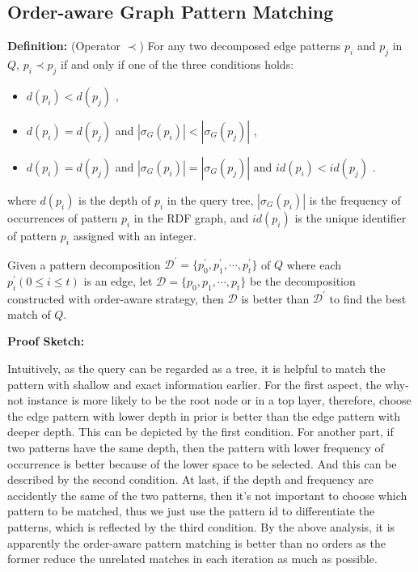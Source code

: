 \documentclass{article}
\begin{document}



\subsection{Order-aware Graph Pattern Matching}
\textbf{Definition:} (Operator $\prec$) For any two decomposed edge patterns $p_i$  and $p_j$ in $Q$, $p_i \prec p_j$ if and only if one of the three conditions holds:
\begin{itemize}
\item $d(p_i) < d(p_j)$ ,
\item $d(p_i) = d(p_j)$ and $|\sigma_G (p_i)| < |\sigma_G (p_j)|$ ,
\item $d(p_i) = d(p_j)$ and $|\sigma_G (p_i )| = |\sigma_G (p_j)|$ and $id(p_i ) < id(p_j )$ .
\end{itemize}

where $d(p_i)$ is the depth of $p_i$ in the query tree, $|\sigma_G(p_i)|$ is the frequency of occurrences of pattern $p_i$ in the RDF graph, and $id(p_i)$ is the unique identifier of pattern $p_i$ assigned with an integer.

\begin{thm}

Given a pattern decomposition $\mathcal{D}^{'} = \{p_0^{'}, p_1^{'}, \cdots, p_t^{'}\}$ of $Q$ where each  $p_i^{'}(0 \leq i \leq t)$ is an edge, let $\mathcal{D} = \{p_0, p_1, \cdots, p_t\}$ be the decomposition constructed with order-aware strategy, then $\mathcal{D}$ is better than $\mathcal{D}^{'}$ to find the best match of $Q$.

\end{thm}



\textbf{Proof Sketch:}

Intuitively, as the query can be regarded as a tree, it is helpful to match the pattern with shallow and exact information earlier. For the first aspect, the why-not instance is more likely to be the root node or in a top layer, therefore, choose the edge pattern with lower depth in prior is better than the edge pattern with deeper depth. This can be depicted by the first condition. For another part, if two patterns have the same depth, then the pattern with lower frequency of occurrence is better because of the lower space to be selected. And this can be described by the second condition. At last, if the depth and frequency are accidently the same of the two patterns, then it’s not important to choose which pattern to be matched, thus we just use the pattern id to differentiate the patterns, which is reflected by the third condition. By the above analysis, it is apparently the order-aware pattern matching is better than no orders as the former reduce the unrelated matches in each iteration as much as possible.
\end{document}
